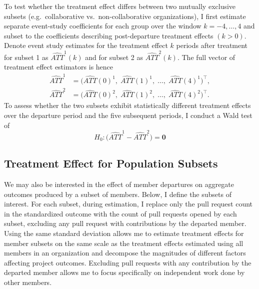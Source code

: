 \documentclass[12pt,notitlepage]{article}
\begin{document}
To test whether the treatment effect differs between two mutually exclusive subsets (e.g.\ collaborative vs.\ non-collaborative organizations), I first estimate separate event-study coefficients for each group over the window \(k=-4,\dots,4\) and subset to the coefficients describing post-departure treatment effects $(k>0)$. Denote event study estimates for the treatment effect $k$ periods after treatment for subset 1 as $\widehat{ATT}^1(k)$ and for subset 2 as $\widehat{ATT}^2(k)$. The full vector of treatment effect estimators is hence
\begin{align*}
\widehat{ATT}^1
&= \bigl(\widehat{ATT}(0)^1,\;\widehat{ATT}(1)^1,\;\dots,\;\widehat{ATT}(4)^1\bigr)^{\!\top},\\
\widehat{ATT}^2
&= \bigl(\widehat{ATT}(0)^2,\;\widehat{ATT}(1)^2,\;\dots,\;\widehat{ATT}(4)^2\bigr)^{\!\top}.
\end{align*} 
To assess whether the two subsets exhibit statistically different treatment effects over the departure period and the five subsequent periods, I conduct a Wald test of
\begin{equation}
H_0\colon \bigl (\widehat{ATT}^1 - \widehat{ATT}^2\bigr ) = \mathbf{0} \label{eq:wald_test}
\end{equation}

\subsection{Treatment Effect for Population Subsets} \label{sec:contr_subset}
We may also be interested in the effect of member departures on aggregate outcomes produced by a subset of members. Below, I define the subsets of interest. For each subset, during estimation, I replace only the pull request count in the standardized outcome with the count of pull requests opened by each subset, excluding any pull request with contributions by the departed member. Using the same standard deviation allows me to estimate treatment effects for member subsets on the same scale as the treatment effects estimated using all members in an organization and decompose the magnitudes of different factors affecting project outcomes. Excluding pull requests with any contribution by the departed member allows me to focus specifically on independent work done by other members. 
\end{document}
